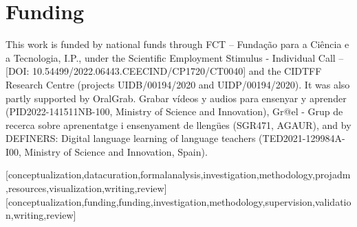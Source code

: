 \documentclass[english]{textolivre}
\begin{document}
\begin{polyabstract}
\begin{portuguese}
\begin{abstract}
\end{abstract}
\end{portuguese}
\end{polyabstract}

%
%
%
%


\section*{Funding}\label{sec-funding}
This work is funded by national funds through FCT – Fundação para a Ciência e a Tecnologia, I.P., under the Scientific Employment Stimulus - Individual Call – [DOI: 10.54499/2022.06443.CEECIND/CP1720/CT0040] and the CIDTFF Research Centre (projects UIDB/00194/2020 and UIDP/00194/2020). It was also partly supported by OralGrab. Grabar vídeos y audios para ensenyar y aprender (PID2022-141511NB-100, Ministry of Science and Innovation), Gr@el - Grup de recerca sobre aprenentatge i ensenyament de llengües (SGR471, AGAUR), and by DEFINERS: Digital language learning of language teachers (TED2021-129984A-I00, Ministry of Science and Innovation, Spain).


\printbibliography
\label{sec-bib}
\begin{contributors}
[conceptualization,datacuration,formalanalysis,investigation,methodology,projadm,resources,visualization,writing,review]
[conceptualization,funding,funding,investigation,methodology,supervision,validation,writing,review]
\end{contributors}


\newpage

\end{document}
